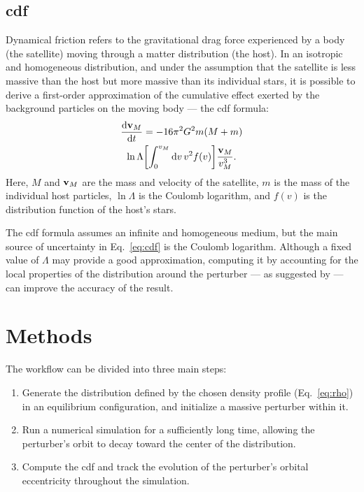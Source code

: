 \documentclass[twocolumn, a4paper]{article}
\begin{document}
\subsection{\acrlong{cdf}} \label{sec:cdf_intro}

Dynamical friction refers to the gravitational drag force experienced by a body (the satellite) moving through a matter distribution (the host). In an isotropic and homogeneous distribution, and under the assumption that the satellite is less massive than the host but more massive than its individual stars, it is possible to derive a first-order approximation of the cumulative effect exerted by the background particles on the moving body — the \acrfull{cdf} formula:
\begin{multline}
    \dv{\vb{v}_M}{t} = -16 \pi^2 G^2 m\qty(M + m) \\
    \ln\Lambda \qty[\int_0^{v_M} \dd{v} v^2 f\qty(v)] \dfrac{\vb{v}_M}{v_M^3}.
    \label{eq:cdf}
\end{multline}
Here, \(M\) and \(\vb{v}_M\) are the mass and velocity of the satellite, \(m\) is the mass of the individual host particles, \(\ln\Lambda\) is the Coulomb logarithm, and \(f(v)\) is the distribution function of the host's stars.

The \acrshort{cdf} formula assumes an infinite and homogeneous medium, but the main source of uncertainty in Eq.~\ref{eq:cdf} is the Coulomb logarithm. Although a fixed value of \(\Lambda\) may provide a good approximation, computing it by accounting for the local properties of the distribution around the perturber — as suggested by \citet{Just2010} — can improve the accuracy of the result.

\section{Methods}

The workflow can be divided into three main steps:
\begin{enumerate}
    \item Generate the distribution defined by the chosen density profile (Eq.~\ref{eq:rho}) in an equilibrium configuration, and initialize a massive perturber within it.
    \item Run a numerical simulation for a sufficiently long time, allowing the perturber's orbit to decay toward the center of the distribution.
    \item Compute the \acrshort{cdf} and track the evolution of the perturber's orbital eccentricity throughout the simulation.
\end{enumerate}
\end{document}
